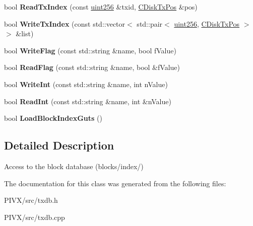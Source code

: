 \begin{DoxyCompactItemize}
bool {\bfseries Read\+Tx\+Index} (const \mbox{\hyperlink{classuint256}{uint256}} \&txid, \mbox{\hyperlink{struct_c_disk_tx_pos}{C\+Disk\+Tx\+Pos}} \&pos)
\item 
\mbox{\label{class_c_block_tree_d_b_a1e03745f9675ad352a1483a0aa7ef308}} 
bool {\bfseries Write\+Tx\+Index} (const std\+::vector$<$ std\+::pair$<$ \mbox{\hyperlink{classuint256}{uint256}}, \mbox{\hyperlink{struct_c_disk_tx_pos}{C\+Disk\+Tx\+Pos}} $>$ $>$ \&list)
\item 
\mbox{\label{class_c_block_tree_d_b_af2f65b70ac5d8a198d4f29a7e909c08a}} 
bool {\bfseries Write\+Flag} (const std\+::string \&name, bool f\+Value)
\item 
\mbox{\label{class_c_block_tree_d_b_acd779c4653fd9a87fffe95d53ce7c6d3}} 
bool {\bfseries Read\+Flag} (const std\+::string \&name, bool \&f\+Value)
\item 
\mbox{\label{class_c_block_tree_d_b_aa2d6d0eae914f49212b8a439f099d331}} 
bool {\bfseries Write\+Int} (const std\+::string \&name, int n\+Value)
\item 
\mbox{\label{class_c_block_tree_d_b_a120ccdce99265a3c18096c521efe2420}} 
bool {\bfseries Read\+Int} (const std\+::string \&name, int \&n\+Value)
\item 
\mbox{\label{class_c_block_tree_d_b_a12be19bb1d7253eeb40e1aa88b032346}} 
bool {\bfseries Load\+Block\+Index\+Guts} ()
\end{DoxyCompactItemize}


\subsection{Detailed Description}
Access to the block database (blocks/index/) 

The documentation for this class was generated from the following files\+:\begin{DoxyCompactItemize}
\item 
P\+I\+V\+X/src/txdb.\+h\item 
P\+I\+V\+X/src/txdb.\+cpp\end{DoxyCompactItemize}
